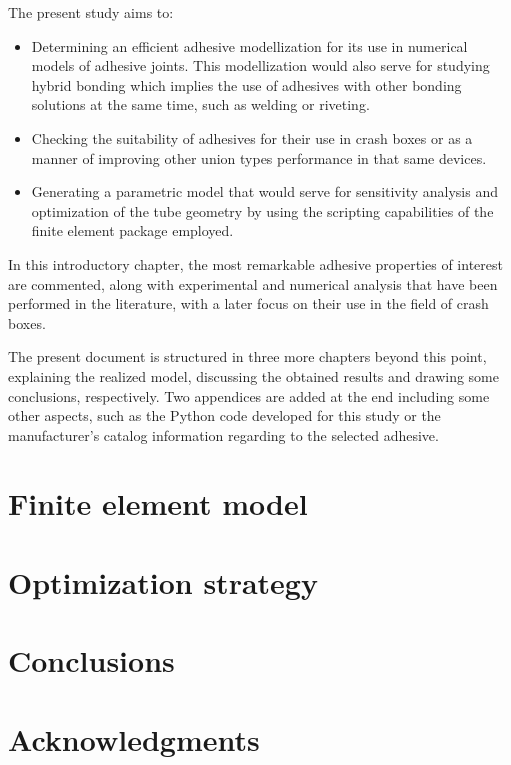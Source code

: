 \documentclass[cmfonts]{witpress}
\begin{document}
The present study aims to:

\begin{itemize}
	\item Determining an efficient adhesive modellization for its use in numerical models of adhesive joints. This modellization would also serve for studying hybrid bonding which implies the use of adhesives with other bonding solutions at the same time, such as welding or riveting.

	\item Checking the suitability of adhesives for their use in crash boxes or as a manner of improving other union types performance in that same devices.

	\item Generating a parametric model that would serve for sensitivity analysis and  optimization of the tube geometry by using the scripting capabilities of the finite element package employed.
\end{itemize}

In this introductory chapter, the most remarkable adhesive properties of interest are commented, along with experimental and numerical analysis that have been performed in the literature, with a later focus on their use in the field of crash boxes.

The present document is structured in three more chapters beyond this point, explaining the realized model, discussing the obtained results and drawing some conclusions, respectively. Two appendices are added at the end including some other aspects, such as the Python code developed for this study or the manufacturer's catalog information regarding to the selected adhesive.

\section{Finite element model}
\cite{brebbia84}
\section{Optimization strategy}
\section{Conclusions}
\section{Acknowledgments}




\end{document}
